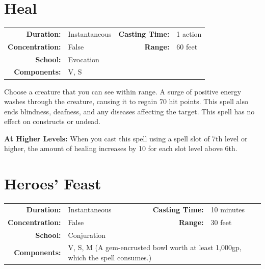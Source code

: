 \documentclass[12pt,showtrims]{memoir}
\begin{document}
\newpage
\section*{Heal}

{
\small\centering\vspace{-6pt}
\begin{tabular}{rlrl}
\toprule

\textbf{Duration:} & Instantaneous &
\textbf{Casting Time:} & 1 action \\
\textbf{Concentration:} & False &
\textbf{Range:} & 60 feet \\
\textbf{School:} & Evocation \\
\textbf{Components:} & \multicolumn{3}{p{0.7\textwidth}}{V, S}\\

\bottomrule
\end{tabular}
}

\vspace{1\baselineskip}\noindent Choose a creature that you can see within range. A surge of positive energy washes through the creature, causing it to regain 70 hit points. This spell also ends blindness, deafness, and any diseases affecting the target. This spell has no effect on constructs or undead.

\vspace{8pt} \noindent\textbf{At Higher Levels:} When you cast this spell using a spell slot of 7th level or higher, the amount of healing increases by 10 for each slot level above 6th.
\newpage
\section*{Heroes' Feast}

{
\small\centering\vspace{-6pt}
\begin{tabular}{rlrl}
\toprule

\textbf{Duration:} & Instantaneous &
\textbf{Casting Time:} & 10 minutes \\
\textbf{Concentration:} & False &
\textbf{Range:} & 30 feet \\
\textbf{School:} & Conjuration \\
\textbf{Components:} & \multicolumn{3}{p{0.7\textwidth}}{V, S, M (A gem-encrusted bowl worth at least 1,000gp, which the spell consumes.)}\\

\bottomrule
\end{tabular}
}
\end{document}
